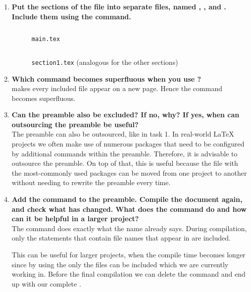 \begin{enumerate}
  \item 
       \textbf{Put the sections of the file into separate files, named 
    	, , and 
    	. 
    	Include them using the   command.}
    \begin{figure}[H]
      \inputminted[linenos=true]{latex}{exercises/project-structure/main-with-preamble.done.tex}
      \caption{\texttt{main.tex}}
    \end{figure}
    \begin{figure}[H]
      \inputminted[linenos=true,breaklines=true]{latex}{exercises/project-structure/section1.done.tex}
      \caption{\texttt{section1.tex} (analogous for the other 
      sections)}
  \end{figure}
    \item \textbf{Which command becomes superfluous when you use 
  	?} \\
  	 makes every included file appear on a 
  	new 
  	page. Hence the command  becomes 
  	superfluous.
  \item 
    \textbf{Can the preamble also be excluded? If no, why? If yes, when can 
    	outsourcing the preamble be useful?} \\
    The preamble can also be outsourced, like in task 1. In real-world \LaTeX{} 
    projects we often make use of numerous packages that need to be configured 
    by additional commands within the preamble. Therefore, it is advisable to 
    outsource the preamble. On top of that, this is useful because the file 
    with the most-commonly used packages can be moved from one project to 
    another without needing to rewrite the preamble every time.
  \item 
    \textbf{Add the command  to the 
    preamble. Compile the document again, and check what has changed. What does 
    the command do and how can it be helpful in a larger project? } \\
	The command  does 
	exactly what 
	the name already says. During compilation, only the 
	statements that contain file names that appear in 
	 are included.
	
	This can be useful for larger projects, when the compile time becomes 
	longer since by using the  only the 
	files 
	can be included which we are currently working in. Before the final 
	compilation we can delete the  
	command and 
	end up with our complete .
    
\end{enumerate}